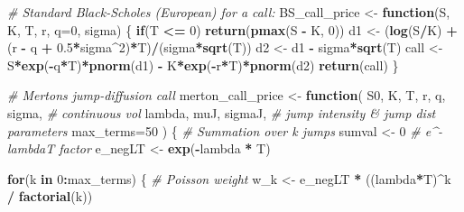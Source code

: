 \documentclass[
]{article}
\newenvironment{Shaded}{\begin{snugshade}}{\end{snugshade}}
\newcommand{\AttributeTok}[1]{\textcolor[rgb]{0.13,0.29,0.53}{#1}}
\newcommand{\CommentTok}[1]{\textcolor[rgb]{0.56,0.35,0.01}{\textit{#1}}}
\newcommand{\ControlFlowTok}[1]{\textcolor[rgb]{0.13,0.29,0.53}{\textbf{#1}}}
\newcommand{\DecValTok}[1]{\textcolor[rgb]{0.00,0.00,0.81}{#1}}
\newcommand{\FloatTok}[1]{\textcolor[rgb]{0.00,0.00,0.81}{#1}}
\newcommand{\FunctionTok}[1]{\textcolor[rgb]{0.13,0.29,0.53}{\textbf{#1}}}
\newcommand{\NormalTok}[1]{#1}
\newcommand{\OtherTok}[1]{\textcolor[rgb]{0.56,0.35,0.01}{#1}}
\newcommand{\SpecialCharTok}[1]{\textcolor[rgb]{0.81,0.36,0.00}{\textbf{#1}}}
\begin{document}
\begin{Shaded}
\begin{Highlighting}[]
\CommentTok{\# Standard Black{-}Scholes (European) for a call:}
\NormalTok{BS\_call\_price }\OtherTok{\textless{}{-}} \ControlFlowTok{function}\NormalTok{(S, K, T, r, }\AttributeTok{q=}\DecValTok{0}\NormalTok{, sigma) \{}
  \ControlFlowTok{if}\NormalTok{(T }\SpecialCharTok{\textless{}=} \DecValTok{0}\NormalTok{) }\FunctionTok{return}\NormalTok{(}\FunctionTok{pmax}\NormalTok{(S }\SpecialCharTok{{-}}\NormalTok{ K, }\DecValTok{0}\NormalTok{))}
\NormalTok{  d1 }\OtherTok{\textless{}{-}}\NormalTok{ (}\FunctionTok{log}\NormalTok{(S}\SpecialCharTok{/}\NormalTok{K) }\SpecialCharTok{+}\NormalTok{ (r }\SpecialCharTok{{-}}\NormalTok{ q }\SpecialCharTok{+} \FloatTok{0.5}\SpecialCharTok{*}\NormalTok{sigma}\SpecialCharTok{\^{}}\DecValTok{2}\NormalTok{)}\SpecialCharTok{*}\NormalTok{T)}\SpecialCharTok{/}\NormalTok{(sigma}\SpecialCharTok{*}\FunctionTok{sqrt}\NormalTok{(T))}
\NormalTok{  d2 }\OtherTok{\textless{}{-}}\NormalTok{ d1 }\SpecialCharTok{{-}}\NormalTok{ sigma}\SpecialCharTok{*}\FunctionTok{sqrt}\NormalTok{(T)}
\NormalTok{  call }\OtherTok{\textless{}{-}}\NormalTok{ S}\SpecialCharTok{*}\FunctionTok{exp}\NormalTok{(}\SpecialCharTok{{-}}\NormalTok{q}\SpecialCharTok{*}\NormalTok{T)}\SpecialCharTok{*}\FunctionTok{pnorm}\NormalTok{(d1) }\SpecialCharTok{{-}}\NormalTok{ K}\SpecialCharTok{*}\FunctionTok{exp}\NormalTok{(}\SpecialCharTok{{-}}\NormalTok{r}\SpecialCharTok{*}\NormalTok{T)}\SpecialCharTok{*}\FunctionTok{pnorm}\NormalTok{(d2)}
  \FunctionTok{return}\NormalTok{(call)}
\NormalTok{\}}

\CommentTok{\# Merton\textquotesingle{}s jump{-}diffusion call}
\NormalTok{merton\_call\_price }\OtherTok{\textless{}{-}} \ControlFlowTok{function}\NormalTok{(}
\NormalTok{  S0, K, T, r, q, sigma,  }\CommentTok{\# continuous vol}
\NormalTok{  lambda, muJ, sigmaJ,    }\CommentTok{\# jump intensity \& jump dist parameters}
  \AttributeTok{max\_terms=}\DecValTok{50}
\NormalTok{) \{}
  \CommentTok{\# Summation over k jumps}
\NormalTok{  sumval }\OtherTok{\textless{}{-}} \DecValTok{0}
  \CommentTok{\# e\^{}{-}lambdaT factor}
\NormalTok{  e\_negLT }\OtherTok{\textless{}{-}} \FunctionTok{exp}\NormalTok{(}\SpecialCharTok{{-}}\NormalTok{lambda }\SpecialCharTok{*}\NormalTok{ T)}
  
  \ControlFlowTok{for}\NormalTok{(k }\ControlFlowTok{in} \DecValTok{0}\SpecialCharTok{:}\NormalTok{max\_terms) \{}
    \CommentTok{\# Poisson weight}
\NormalTok{    w\_k }\OtherTok{\textless{}{-}}\NormalTok{ e\_negLT }\SpecialCharTok{*}\NormalTok{ ((lambda}\SpecialCharTok{*}\NormalTok{T)}\SpecialCharTok{\^{}}\NormalTok{k }\SpecialCharTok{/} \FunctionTok{factorial}\NormalTok{(k))}
    

\end{Highlighting}
\end{Shaded}
\end{document}
